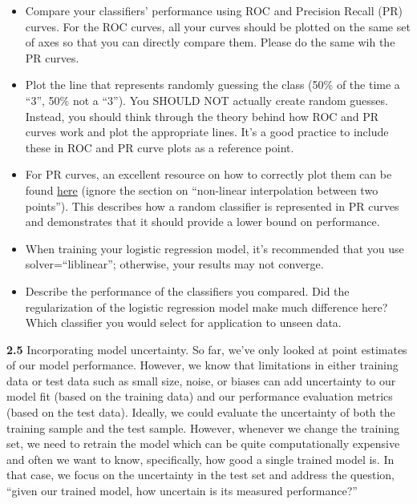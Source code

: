 \documentclass[
  letterpaper,
  DIV=11,
  numbers=noendperiod]{scrartcl}
\providecommand{\tightlist}{%
  \setlength{\itemsep}{0pt}\setlength{\parskip}{0pt}}\usepackage{longtable,booktabs,array}
\begin{document}
\begin{itemize}
\tightlist
\item
  Compare your classifiers' performance using ROC and Precision Recall
  (PR) curves. For the ROC curves, all your curves should be plotted on
  the same set of axes so that you can directly compare them. Please do
  the same wih the PR curves.
\item
  Plot the line that represents randomly guessing the class (50\% of the
  time a ``3'', 50\% not a ``3''). You SHOULD NOT actually create random
  guesses. Instead, you should think through the theory behind how ROC
  and PR curves work and plot the appropriate lines. It's a good
  practice to include these in ROC and PR curve plots as a reference
  point.
\item
  For PR curves, an excellent resource on how to correctly plot them can
  be found
  \href{https://classeval.wordpress.com/introduction/introduction-to-the-precision-recall-plot/}{here}
  (ignore the section on ``non-linear interpolation between two
  points''). This describes how a random classifier is represented in PR
  curves and demonstrates that it should provide a lower bound on
  performance.
\item
  When training your logistic regression model, it's recommended that
  you use solver=``liblinear''; otherwise, your results may not
  converge.
\item
  Describe the performance of the classifiers you compared. Did the
  regularization of the logistic regression model make much difference
  here? Which classifier you would select for application to unseen
  data.
\end{itemize}

\textbf{2.5} Incorporating model uncertainty. So far, we've only looked
at point estimates of our model performance. However, we know that
limitations in either training data or test data such as small size,
noise, or biases can add uncertainty to our model fit (based on the
training data) and our performance evaluation metrics (based on the test
data). Ideally, we could evaluate the uncertainty of both the training
sample and the test sample. However, whenever we change the training
set, we need to retrain the model which can be quite computationally
expensive and often we want to know, specifically, how good a single
trained model is. In that case, we focus on the uncertainty in the test
set and address the question, ``given our trained model, how uncertain
is its measured performance?''
\end{document}
